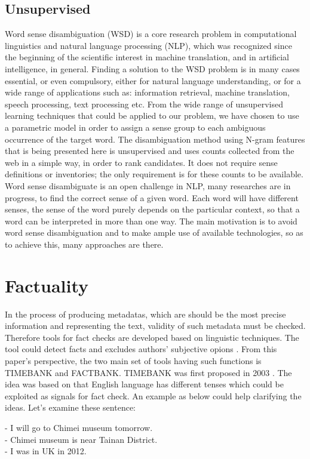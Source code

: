 \subsection*{Unsupervised}
Word sense disambiguation (WSD) is a core research problem in computational linguistics and natural language processing (NLP), which was recognized since the beginning of the scientific interest in machine translation, and in artificial intelligence, in general. Finding a solution to the WSD problem is in many cases essential, or even compulsory, either for natural language understanding, or for a wide range of applications such as: information retrieval, machine translation, speech processing, text processing etc. From the wide range of unsupervised learning techniques that could be applied to our problem, we have chosen to use a parametric model in order to assign a sense group to each ambiguous occurrence of the target word. The disambiguation method using N-gram features that is being presented here is unsupervised and uses counts collected from the web in a simple way, in order to rank candidates. It does not require sense definitions or inventories; the only requirement is for these counts to be available. \\

Word sense disambiguate is an open challenge in NLP, many researches are in progress, to find the correct sense of a given word. Each word will have different senses, the sense of the word purely depends on the particular context, so that a word can be interpreted in more than one way. The main motivation is to avoid word sense disambiguation and to make ample use of available technologies, so as to achieve this, many approaches are there.\\
\section*{Factuality}
In the process of producing metadatas, which are should be the most precise information and representing the text, validity of such metadata must be checked. Therefore tools for fact checks are developed based on linguistic techniques.  The tool could detect facts and excludes authors' subjective opions \cite{agerri2015big}. From this paper's perspective, the two main set of tools having such functions is TIMEBANK and FACTBANK.
TIMEBANK was first proposed in 2003 \cite{pustejovsky2003timebank}. The idea was based on that English language has different tenses which could be exploited as signals for fact check. An example as below could help clarifying the ideas. Let's examine these sentence:\\
\begin{flushleft}
	-	I will go to Chimei museum tomorrow.\\
	-	Chimei museum is near Tainan District.\\
	-	I was in UK in 2012.\\
\end{flushleft}

